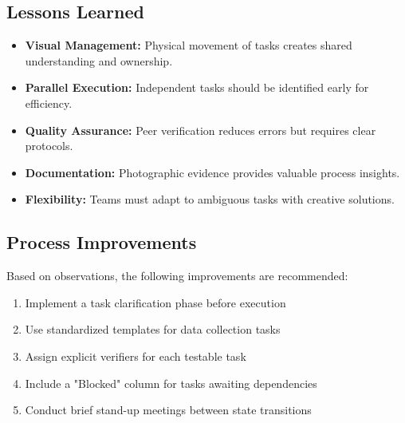 \subsection{Lessons Learned}
\begin{itemize}
    \item \textbf{Visual Management:} Physical movement of tasks creates shared understanding and ownership.
    \item \textbf{Parallel Execution:} Independent tasks should be identified early for efficiency.
    \item \textbf{Quality Assurance:} Peer verification reduces errors but requires clear protocols.
    \item \textbf{Documentation:} Photographic evidence provides valuable process insights.
    \item \textbf{Flexibility:} Teams must adapt to ambiguous tasks with creative solutions.
\end{itemize}

\subsection{Process Improvements}
Based on observations, the following improvements are recommended:
\begin{enumerate}
    \item Implement a task clarification phase before execution
    \item Use standardized templates for data collection tasks
    \item Assign explicit verifiers for each testable task
    \item Include a "Blocked" column for tasks awaiting dependencies
    \item Conduct brief stand-up meetings between state transitions
\end{enumerate}